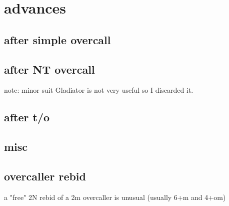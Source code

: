 \section{advances}

\subsection{after simple overcall}


\subsection{after NT overcall}


note: minor suit Gladiator is not very useful so I discarded it.

\subsection{after t/o}


\subsection{misc}


\subsection{overcaller rebid}

a "free" 2N rebid of a 2m overcaller is unusual (usually 6+m and 4+om)